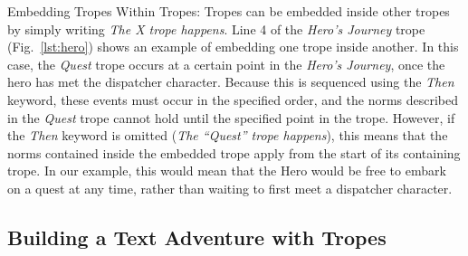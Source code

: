 \begin{compactdesc}
\item[Embedding Tropes Within Tropes:]
Tropes can be embedded inside other tropes by simply writing \emph{The X trope happens}.
Line 4 of the \emph{Hero's Journey} trope (Fig.~\ref{lst:hero}) shows an example of embedding one trope inside another. In this case, the \emph{Quest} trope occurs at a certain point in the \emph{Hero's Journey}, once the hero has met the dispatcher character. Because this is sequenced using the \emph{Then} keyword, these events must occur in the specified order, and the norms described in the \emph{Quest} trope cannot hold until the specified point in the trope. However, if the \emph{Then} keyword is omitted (\emph{The ``Quest'' trope happens}), this means that the norms contained inside the embedded trope apply from the start of its containing trope. In our example, this would mean that the Hero would be free to embark on a quest at any time, rather than waiting to first meet a dispatcher character.
\end{compactdesc}

\subsection{Building a Text Adventure with Tropes} %
\label{sec:tropes-text}

